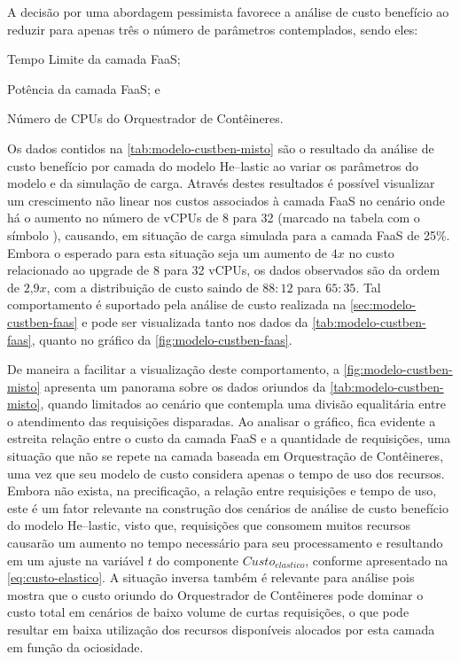 \documentclass[english,brazilian]{UNISINOSmonografia} %
\begin{document}
A decisão por uma abordagem pessimista favorece a análise de custo benefício ao reduzir para apenas três o número de parâmetros contemplados, sendo eles: 
\begin{inparaenum}[(i)]
	\item Tempo Limite da camada FaaS;
	\item Potência da camada FaaS; e
	\item Número de CPUs do Orquestrador de Contêineres.
\end{inparaenum}
Os dados contidos na \autoref{tab:modelo-custben-misto} são o resultado da análise de custo benefício por camada do modelo \textsf{He}--lastic ao variar os parâmetros do modelo e da simulação de carga.
Através destes resultados é possível visualizar um crescimento não linear nos custos associados à camada FaaS no cenário onde há o aumento no número de vCPUs de 8 para 32 (marcado na tabela com o símbolo \dag), causando, em situação de carga simulada para a camada FaaS de 25\%.
Embora o esperado para esta situação seja um aumento de $4x$ no custo relacionado ao upgrade de 8 para 32 vCPUs, os dados observados são da ordem de $2\text{,}9x$, com a distribuição de custo saindo de $88:12$ para $65:35$.
Tal comportamento é suportado pela análise de custo realizada na \autoref{sec:modelo-custben-faas} e pode ser visualizada tanto nos dados da \autoref{tab:modelo-custben-faas}, quanto no gráfico da \autoref{fig:modelo-custben-faas}.



De maneira a facilitar a visualização deste comportamento, a \autoref{fig:modelo-custben-misto} apresenta um panorama sobre os dados oriundos da \autoref{tab:modelo-custben-misto}, quando limitados ao cenário que contempla uma divisão equalitária entre o atendimento das requisições disparadas.
Ao analisar o gráfico, fica evidente a estreita relação entre o custo da camada FaaS e a quantidade de requisições, uma situação que não se repete na camada baseada em Orquestração de Contêineres, uma vez que seu modelo de custo considera apenas o tempo de uso dos recursos.
Embora não exista, na precificação, a relação entre requisições e tempo de uso, este é um fator relevante na construção dos cenários de análise de custo benefício do modelo \textsf{He}--lastic, visto que, requisições que consomem muitos recursos causarão um aumento no tempo necessário para seu processamento e resultando em um ajuste na variável $t$ do componente $Custo_{elastico}$, conforme apresentado na \autoref{eq:custo-elastico}.
A situação inversa também é relevante para análise pois mostra que o custo oriundo do Orquestrador de Contêineres pode dominar o custo total em cenários de baixo volume de curtas requisições, o que pode resultar em baixa utilização dos recursos disponíveis alocados por esta camada em função da ociosidade.
\end{document}
